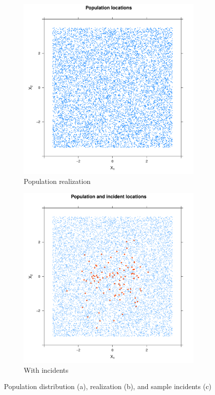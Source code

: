 \begin{figure}[htbp]
\begin{subfigure}[t]{0.32\textwidth}
    \includegraphics[width=\textwidth]{output/population-points}
    \caption{Population realization}
    \end{subfigure}%
    \begin{subfigure}[t]{0.32\textwidth}
    \includegraphics[width=\textwidth]{output/population_and_incidents_scatter}
    \caption{With incidents}
    \end{subfigure}%
    \caption[Uniform population distribution]
        {Population distribution (a), realization (b), and sample incidents (c)}
    \label{fig:cases_scatter:template}    
\end{figure}


